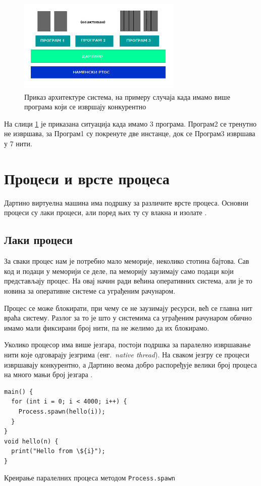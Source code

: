 \documentclass[12pt,oneside]{memoir}
\begin{document}
\begin{figure}[!ht]
  \centering
  \includegraphics[width=0.7\textwidth]{arhitektura.jpg}
  \caption{ Приказ архитектуре система, на примеру случаја када имамо више програма који се извршају конкурентно}
  \label{fig:model}
\end{figure}
На слици \ref{fig:model} је приказана ситуација када имамо 3 програма. Програм2 се тренутно не извршава, за Програм1 су покренуте две инстанце, док се Програм3  извршава у 7 нити.

\section{Процеси и врсте процеса}
Дартино виртуелна машина има подршку за различите врсте процеса. Основни процеси су лаки процеси, али поред њих ту су влакна и изолате \cite{Dartino} \cite{procesi_i_izolate} \cite{korutine_i_vlakna}.
\subsection{Лаки процеси}
За сваки процес нам је потребно мало меморије, неколико стотина бајтова. Сав код и подаци у меморији се деле, па меморију заузимају само подаци који представљају процес. На овај начин ради већина оперативних система, али је то новина за оперативне системе са уграђеним рачунаром.

Процес се може блокирати, при чему се не заузимају ресурси, већ се главна нит враћа систему. Разлог за то је што у системима са уграђеним рачунаром обично имамо мали фиксирани број нити, па не желимо да их блокирамо. 

Уколико процесор има више језгара, постоји подршка за паралелно извршавање нити које одговарају језгрима (енг.~\textit{native thread}). На сваком језгру се процеси извршавају конкурентно, а Дартино веома добро распоређује велики број процеса на много мањи број језгара \cite{Dartino}.

\begin{listing}
\begin{verbatim}
main() {
  for (int i = 0; i < 4000; i++) {
    Process.spawn(hello(i));
  }
}
void hello(n) {
  print("Hello from \${i}");
}
\end{verbatim}
\caption{Креирање паралелних процеса методом \texttt{Process.spawn}}
\label{paralelniprocesi}
\end{listing}
\end{document}
